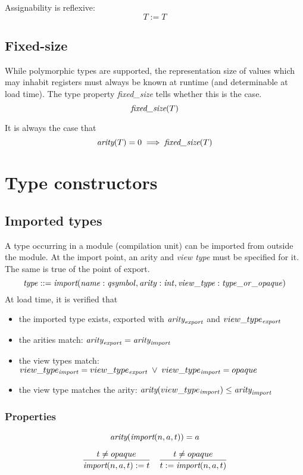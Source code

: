 \documentclass[a4paper]{report}
\newcommand\arity{{\ensuremath\textit{arity}}}
\newcommand\fixedsize{{\ensuremath\textit{fixed\_size}}}
\newcommand\implies{\;\Longrightarrow\;}
\newcommand\tyImport{{\ensuremath\textit{import}}}
\begin{document}
Assignability is reflexive:
$$T := T$$

\subsection{Fixed-size}
While polymorphic types are supported, the representation size of values
which may inhabit registers must always be known at runtime (and
determinable at load time).
The type property \emph{fixed\_size} tells whether this is the case.
$$
\fixedsize(T)
$$

It is always the case that
$$
\arity(T) = 0 \implies \fixedsize(T)
$$

\section{Type constructors}

\subsection{Imported types}
A type occurring in a module (compilation unit) can be imported from
outside the module.
At the import point, an arity and \emph{view type} must be specified for it.
The same is true of the point of export.
$$
\it type ::= \tyImport(name : qsymbol, arity : int, view\_type : type\_or\_opaque)
$$
At load time, it is verified that
\begin{itemize}
\item the imported type exists, exported with $\arity_{\it export}$
  and $view\_type_{\it export}$
\item the arities match: $\arity_{\it export} = \arity_{\it import}$
\item the view types match:\\
$view\_type_{\it import} = view\_type_{\it export} \;\lor\; view\_type_{\it import} = opaque$
\item the view type matches the arity: $\arity(view\_type_{\it import}) \le \arity_{\it import}$
\end{itemize}

\subsubsection*{Properties}
$$\arity(\tyImport(n, a, t)) = a$$

$$
{t \neq opaque
\over
\tyImport(n,a,t) := t}
\quad
{t \neq opaque
\over
t := \tyImport(n,a,t)}
$$
\end{document}
